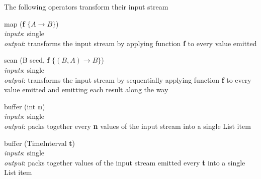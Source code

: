\documentclass{dithesis}
\begin{document}
The following operators transform their input stream
\begin{description}

\begin{minipage}[c]{\lll}
\item[map] (\textbf{f} $\{ A \to B \}$)\\
	\textit{inputs}: single \\
	\textit{output}: transforms the input stream by applying function \textbf{f} to every value emitted	
\end{minipage}
\hfill
\begin{minipage}[c]{\rrr}

\end{minipage}
\newline \newline \newline
\begin{minipage}[c]{\lll}
\item[scan] (B seed, \textbf{f} $\{ (B, A) \to B \}$)\\
	\textit{inputs}: single \\
	\textit{output}: transforms the input stream by sequentially applying function \textbf{f} to every value emitted  and emitting each result along the way
\end{minipage}
\hfill
\begin{minipage}[c]{\rrr}

\end{minipage}
\newline \newline \newline
\begin{minipage}[c]{\lll}
\item[buffer] (int \textbf{n})\\
	\textit{inputs}: single \\
	\textit{output}: packs together every \textbf{n} values of the input stream into a single List item
\end{minipage}
\hfill
\begin{minipage}[c]{\rrr}

\end{minipage}
\newline \newline \newline
\begin{minipage}[c]{\lll}
\item[buffer] (TimeInterval \textbf{t})\\
	\textit{inputs}: single \\
	\textit{output}: packs together values of the input stream emitted every \textbf{t} into a single List item
\end{minipage}
\newline \newline \newline
\end{description}
\end{document}
